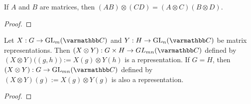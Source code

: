 \begin{theorem}
	If $A$ and $B$ are matrices, then $(AB) \otimes (CD) = (A \otimes C)(B \otimes D)$.	
\end{theorem}
{\color{red}
\begin{proof}
		
\end{proof}}

\begin{proposition}
	Let $X:G \rightarrow \GL_m(\bfC)$ and $Y:H \rightarrow \GL_n(\bfC)$ be matrix representations. Then $(X \otimes Y) : G \times H \rightarrow GL_{mn}(\bfC)$ defined by $(X \otimes Y)\bigl( (g,h) \bigr) := X(g) \otimes Y(h)$ is a representation. If $G = H$, then $(X \otimes Y):G \rightarrow \GL_{mn}(\bfC)$ defined by $(X \otimes Y)(g) := X(g) \otimes Y(g)$ is also a representation.
\end{proposition}
{\color{red}
\begin{proof}
		
\end{proof}}

